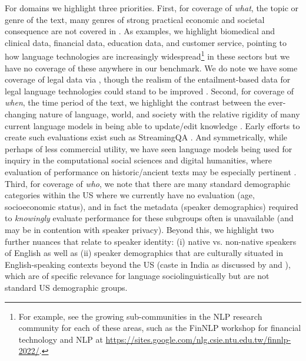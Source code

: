 For domains we highlight three priorities.
First, for coverage of \textit{what}, \ie the topic or genre of the text, many genres of strong practical economic and societal consequence are not covered in \benchmarkname.
As examples, we highlight biomedical and clinical data, financial data, education data, and customer service, pointing to how language technologies are increasingly widespread\footnote{For example, see the growing sub-communities in the NLP research community for each of these areas, such as the FinNLP workshop for financial technology and NLP at \url{https://sites.google.com/nlg.csie.ntu.edu.tw/finnlp-2022/}.} in these sectors but we have no coverage of these anywhere in our benchmark.
We do note we have some coverage of legal data via \legalsupport, though the realism of the entailment-based data for legal language technologies could stand to be improved \citep[\cf][]{guha2022legalbench}.
Second, for coverage of \textit{when}, \ie the time period of the text, we highlight the contrast between the ever-changing nature of language, world, and society with the relative rigidity of many current language models in being able to update/edit knowledge \citep{lazaridou2021mind}.
Early efforts to create such evaluations exist such as StreamingQA \citep{liska2022streamingqa}. 
And symmetrically, while perhaps of less commercial utility, we have seen language models being used for inquiry in the computational social sciences and digital humanities, where evaluation of performance on historic/ancient texts may be especially pertinent \citep[see][]{bamman2020latin, yamshchikov2022plutarch}.
Third, for coverage of \textit{who}, we note that there are many standard demographic categories within the US where we currently have no evaluation (\eg age, socioeconomic status), and in fact the metadata (\ie speaker demographics) required to \textit{knowingly} evaluate performance for these subgroups often is unavailable (and may be in contention with speaker privacy). 
Beyond this, we highlight two further nuances that relate to speaker identity:
(i) native vs. non-native speakers of English as well as (ii) speaker demographics that are culturally situated in English-speaking contexts beyond the US (\eg caste in India as discussed by \citet{sambasivan2021reimagining} and \citet{bhatt2022recontextualizing}), which are of specific relevance for language sociolinguistically but are not standard US demographic groups.

